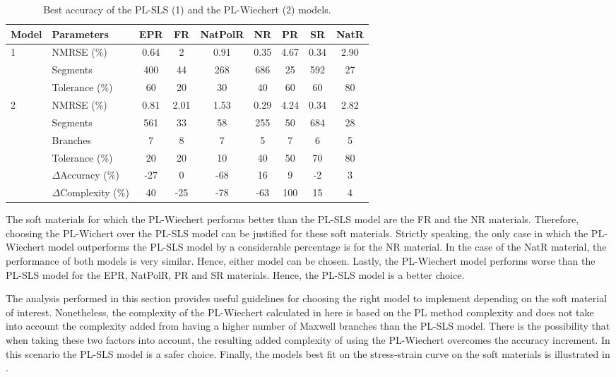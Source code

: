 \begin{table*}[htbp!]
	\centering
	\caption{Best accuracy of the PL-SLS (1) and the PL-Wiechert (2) models.}
	\label{tbl:PLModelsPerformance}
	\begin{tabular}{llccccccc} \toprule
		Model 					& Parameters 		& EPR	& FR & NatPolR & NR & PR & SR & NatR \\
		\hline
		\multirow{3}{*}{1}  & NMRSE (\%)		& 0.64	& 2 & 0.91 & 0.35 & 4.67 & 0.34 & 2.90 \\
								& Segments		& 400	& 44 & 268 & 686 & 25 & 592 & 27 \\
								& Tolerance (\%)	& 60	& 20 & 30 & 40 & 60 & 60 & 80 \\
		\hline 
		\multirow{6}{*}{2}  & NMRSE (\%)	& 0.81	& 2.01 & 1.53 & 0.29 & 4.24 & 0.34 & 2.82 \\
								& Segments		& 561	& 33 & 58 & 255 & 50 & 684 & 28 \\
								& Branches		& 7 	& 8 & 7 & 5 & 7 & 6 & 5 \\
								& Tolerance	(\%)	& 20	& 20 & 10 & 40 & 50 & 70 & 80 \\
								& $\Delta$Accuracy (\%)	& -27	& 0 & -68 & 16 & 9 & -2 & 3 \\
								& $\Delta$Complexity (\%)	& 40	& -25 & -78 & -63 & 100 & 15 & 4 \\
		\bottomrule
	\end{tabular}
\end{table*}

The soft materials for which the PL-Wiechert performs better than the PL-SLS model are the FR and the NR materials. Therefore, choosing the PL-Wichert over the PL-SLS model can be justified for these soft materials. Strictly speaking, the only case in which the PL-Wiechert model outperforms the PL-SLS model by a considerable percentage is for the NR material. In the case of the NatR material, the performance of both models is very similar. Hence, either model can be chosen. Lastly, the PL-Wiechert model performs worse than the PL-SLS model for the EPR, NatPolR, PR and SR materials. Hence, the PL-SLS model is a better choice.

The analysis performed in this section provides useful guidelines for choosing the right model to implement depending on the soft material of interest. Nonetheless, the complexity of the PL-Wiechert calculated in here is based on the PL method complexity and does not take into account the complexity added from having a higher number of Maxwell branches than the PL-SLS model. There is the possibility that when taking these two factors into account, the resulting added complexity of using the PL-Wiechert overcomes the accuracy increment. In this scenario the PL-SLS model is a safer choice. Finally, the models best fit on the stress-strain curve on the soft materials is illustrated in .

